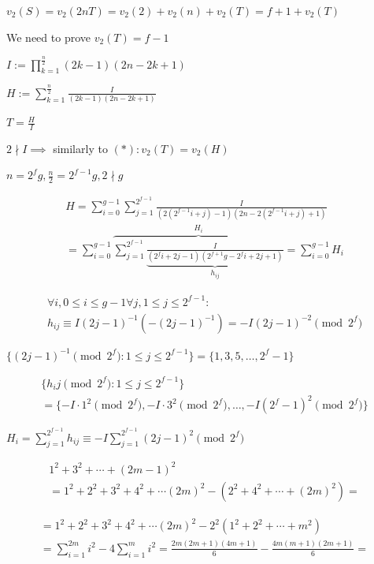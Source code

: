 \documentclass{article}
\begin{document}
\( v_{2}(S) = v_{2}(2nT) = v_{2}(2) + v_{2}(n) + v_{2}(T) = f + 1 + v_{2}(T) \)

We need to prove \( v_{2}(T) = f - 1 \)

\( I := \prod_{k=1}^{\frac{n}{2}} (2k-1)(2n-2k+1) \)

\( H := \sum_{k=1}^{\frac{n}{2}}\frac{I}{(2k-1)(2n-2k+1)} \)

\( T = \frac{H}{I} \)

\( 2 \nmid I \implies \) similarly to \( (*): v_{2}(T) = v_{2}(H) \)

\( n=2^{f}g, \frac{n}{2} = 2^{f-1}g, 2 \nmid g \)

\begin{multline*}
H = \sum_{i=0}^{g-1}\sum_{j=1}^{2^{f-1}} \frac{I}{(2(2^{f-1} i + j) - 1)(2n-2(2^{f-1} i + j) + 1)} \\
= \sum_{i=0}^{g-1}\overbrace{\sum_{j=1}^{2^{f-1}} \underbrace{\frac{I}{(2^{f} i + 2j - 1)(2^{f+1}g-2^{f} i + 2j + 1)}}_{h_{ij}}}^{H_{i}} = \sum_{i=0}^{g-1} H_{i}
\end{multline*}

\begin{multline*}
\forall i, 0 \leq i \leq g - 1 \forall j, 1 \leq j \leq 2^{f-1}: \\
h_{ij} \equiv I {(2j-1)}^{-1} (-{(2j-1)}^{-1}) = -I {(2j-1)}^{-2} \pmod {2^{f}}
\end{multline*}

\( \{ {(2j-1)}^{-1} \pmod {2^{f}}: 1 \leq j \leq 2^{f-1} \} = \{ 1, 3, 5, \ldots, 2^{f} - 1 \} \)

\begin{multline*}
\{ h_{i}j \pmod{2^{f}}: 1 \leq j \leq 2^{f-1} \} \\
= \{ -I\cdot 1^{2} \pmod{2^{f}}, -I\cdot 3^{2} \pmod{2^{f}}, \ldots, -I {(2^{f}-1)}^{2} \pmod{2^{f}} \}
\end{multline*}

\( H_{i} = \sum_{j=1}^{2^{f-1}} h_{ij} \equiv -I \sum_{j=1}^{2^{f-1}} {(2j-1)}^{2} \pmod{2^{f}} \)

\begin{multline*}
1^{2} + 3^{2} + \cdots + {(2m-1)}^{2} \\
= 1^{2} + 2^{2} + 3^{2} + 4^{2} + \cdots {(2m)}^{2} - (2^{2} + 4^{2} + \cdots + {(2m)}^{2}) =
\end{multline*}

\begin{multline*}
= 1^{2} + 2^{2} + 3^{2} + 4^{2} + \cdots {(2m)}^{2} - 2^{2} (1^{2} + 2^{2} + \cdots + m^{2}) \\
= \sum_{i=1}^{2m} i^{2} - 4 \sum_{i=1}^{m} i^{2} = \frac{2m(2m+1)(4m+1)}{6} - \frac{4m(m+1)(2m+1)}{6} =
\end{multline*}
\end{document}
